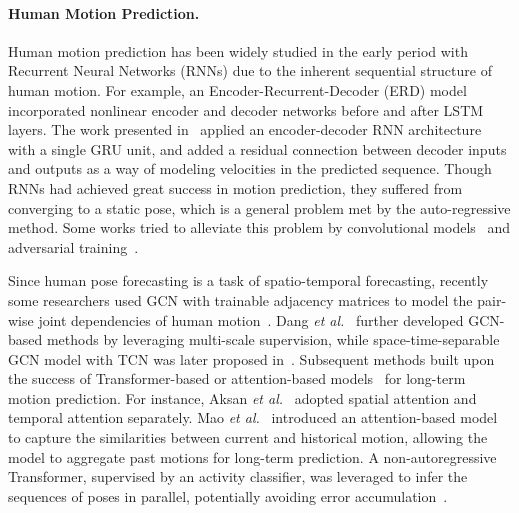 \documentclass[10pt,twocolumn,letterpaper]{article}
\begin{document}
\paragraph{Human Motion Prediction.}
Human motion prediction has been widely studied in the early period with Recurrent Neural Networks (RNNs) due to the inherent sequential structure of human motion. 
For example, an Encoder-Recurrent-Decoder (ERD) model~\cite{fragkiadaki2015recurrent} incorporated nonlinear encoder and decoder networks before and after LSTM layers.
The work presented in~\cite{julieta2017motion} applied an encoder-decoder RNN architecture with a single GRU unit, and added a residual connection between decoder inputs and outputs as a way of modeling velocities in the predicted sequence. 
Though RNNs had achieved great success in motion prediction, they suffered from converging to a static pose, which is a general problem met by the auto-regressive method.
Some works tried to alleviate this problem by convolutional models~\cite{li2018convolutional} and adversarial training~\cite{gui2018adversarial}.


Since human pose forecasting is a task of spatio-temporal forecasting, recently some researchers used GCN with trainable adjacency matrices to model the pair-wise joint dependencies of human motion~\cite{mao2019learning}.
Dang \textit{et al.}~\cite{dang2021msr} further developed GCN-based methods by leveraging multi-scale supervision, while space-time-separable GCN model with TCN was later proposed in~\cite{sofianos2021spacetimeseparable}.
Subsequent methods built upon the success of Transformer-based or attention-based models~\cite{vaswani2017attention} for long-term motion prediction.
For instance, Aksan \textit{et al.}~\cite{9665904} adopted spatial attention and temporal attention separately.
Mao \textit{et al.}~\cite{mao2020history} introduced an attention-based model to capture the similarities between current and historical motion, allowing the model to aggregate past motions for long-term prediction.
A non-autoregressive Transformer, supervised by an activity classifier, was leveraged to infer the sequences of poses in parallel, potentially avoiding error accumulation~\cite{Martinez_potr_ICCV2021}.
\end{document}

